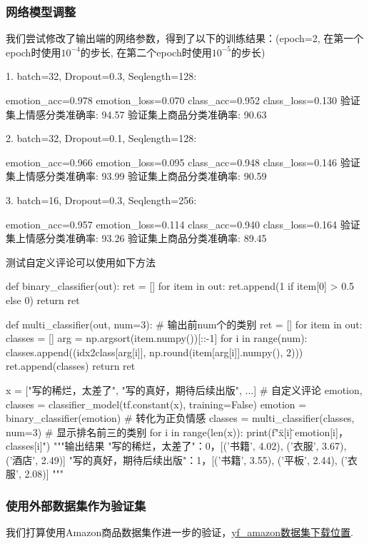 \documentclass[12pt, a4paper, oneside]{ctexart}
\numberwithin{equation}{section}  %
\begin{document}
\subsubsection{网络模型调整}
我们尝试修改了输出端的网络参数，得到了以下的训练结果：(epoch=2, 在第一个epoch时使用$10^{-4}$的步长, 在第二个epoch时使用$10^{-5}$的步长)

1. batch=32, Dropout=0.3, Seqlength=128:
\begin{pythoncode}
emotion_acc=0.978 emotion_loss=0.070 class_acc=0.952 class_loss=0.130
验证集上情感分类准确率: 94.57%
验证集上商品分类准确率: 90.63%
\end{pythoncode}

2. batch=32, Dropout=0.1, Seqlength=128:
\begin{pythoncode}
emotion_acc=0.966 emotion_loss=0.095 class_acc=0.948 class_loss=0.146
验证集上情感分类准确率: 93.99%
验证集上商品分类准确率: 90.59%
\end{pythoncode}

3. batch=16, Dropout=0.3, Seqlength=256:
\begin{pythoncode}
emotion_acc=0.957 emotion_loss=0.114 class_acc=0.940 class_loss=0.164
验证集上情感分类准确率: 93.26%
验证集上商品分类准确率: 89.45%
\end{pythoncode}

测试自定义评论可以使用如下方法
\begin{pythoncode}
def binary_classifier(out):
    ret = []
    for item in out:
        ret.append(1 if item[0] > 0.5 else 0)
    return ret

def multi_classifier(out, num=3):  # 输出前num个的类别
    ret = []
    for item in out:
        classes = []
        arg = np.argsort(item.numpy())[::-1]
        for i in range(num):
            classes.append((idx2class[arg[i]], np.round(item[arg[i]].numpy(), 2)))
        ret.append(classes)
    return ret

x = ["写的稀烂，太差了", "写的真好，期待后续出版", ...]  # 自定义评论
emotion, classes = classifier_model(tf.constant(x), training=False)
emotion = binary_classifier(emotion)  # 转化为正负情感
classes = multi_classifier(classes, num=3)  # 显示排名前三的类别
for i in range(len(x)):
    print(f"\"{x[i]}\"：{emotion[i]}，{classes[i]}")
"""输出结果
"写的稀烂，太差了"：0，[('书籍', 4.02), ('衣服', 3.67), ('酒店', 2.49)]
"写的真好，期待后续出版"：1，[('书籍', 3.55), ('平板', 2.44), ('衣服', 2.08)]
"""
\end{pythoncode}
\subsubsection{使用外部数据集作为验证集}
我们打算使用Amazon商品数据集作进一步的验证，\href{https://github.com/SophonPlus/ChineseNlpCorpus/blob/master/datasets/yf_amazon/intro.ipynb}{yf\_amazon数据集下载位置}.
\end{document}
